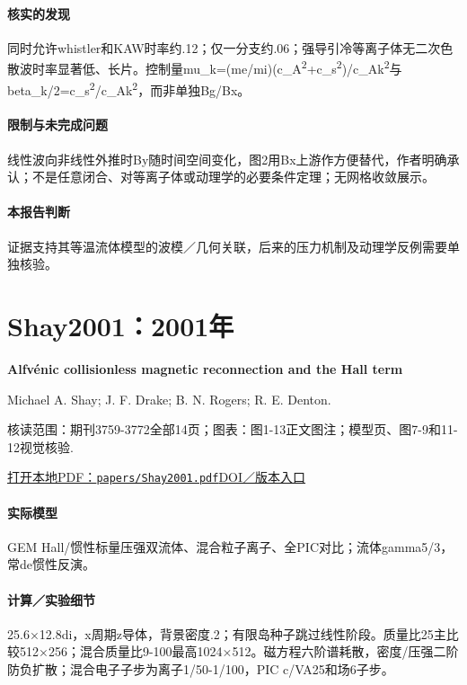 \paragraph{核实的发现}同时允许whistler和KAW时率约.12；仅一分支约.06；强导引冷等离子体无二次色散波时率显著低、长片。控制量mu\_k=(me/mi)(c\_A\textsuperscript{2}+c\_s\textsuperscript{2})/c\_Ak\textsuperscript{2}与beta\_k/2=c\_s\textsuperscript{2}/c\_Ak\textsuperscript{2}，而非单独Bg/Bx。

\paragraph{限制与未完成问题}线性波向非线性外推时By随时间空间变化，图2用Bx上游作方便替代，作者明确承认；不是任意闭合、对等离子体或动理学的必要条件定理；无网格收敛展示。

\paragraph{本报告判断}证据支持其等温流体模型的波模／几何关联，后来的压力机制及动理学反例需要单独核验。

\section{Shay2001：2001年}\label{paper:Shay2001}

\textbf{Alfvénic collisionless magnetic reconnection and the Hall term}\citep{Shay2001}\

Michael A. Shay;  J. F. Drake;  B. N. Rogers;  R. E. Denton.

\textsf{核读范围：}期刊3759-3772全部14页；\textsf{图表：}图1-13正文图注；模型页、图7-9和11-12视觉核验.

\href{run:papers/Shay2001.pdf}{打开本地PDF：\texttt{papers/Shay2001.pdf}}\quad\href{https://doi.org/10.1029/1999ja001007}{DOI／版本入口}

\paragraph{实际模型}GEM Hall/惯性标量压强双流体、混合粒子离子、全PIC对比；流体gamma5/3，常de惯性反演。

\paragraph{计算／实验细节}25.6×12.8di，x周期z导体，背景密度.2；有限岛种子跳过线性阶段。质量比25主比较512×256；混合质量比9-100最高1024×512。磁方程六阶谱耗散，密度/压强二阶防负扩散；混合电子子步为离子1/50-1/100，PIC c/VA25和场6子步。

